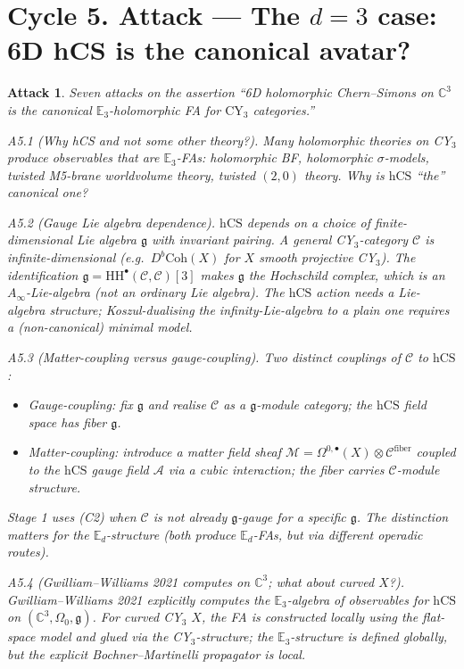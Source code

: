 \documentclass[11pt]{article}
\newtheorem*{attack}{Attack}
\theoremstyle{definition}
\providecommand{\CC}{\mathbb{C}}
\providecommand{\HH}{\mathrm{HH}}
\providecommand{\fg}{\mathfrak{g}}
\providecommand{\cA}{\mathcal{A}}
\providecommand{\cC}{\mathcal{C}}
\providecommand{\cM}{\mathcal{M}}
\providecommand{\hCS}{\mathrm{hCS}}
\providecommand{\Coh}{\mathrm{Coh}}
\begin{document}
\section*{Cycle 5. Attack --- The $d=3$ case: 6D hCS is the canonical avatar?}

\begin{attack}
Seven attacks on the assertion ``6D holomorphic Chern--Simons on
$\CC^3$ is the canonical $\mathbb{E}_3$-holomorphic FA for $\mathrm{CY}_3$
categories.''

\emph{A5.1 (Why hCS and not some other theory?).} Many holomorphic
theories on CY$_3$ produce observables that are $\mathbb{E}_3$-FAs:
holomorphic BF, holomorphic $\sigma$-models, twisted M5-brane
worldvolume theory, twisted $(2,0)$ theory. Why is $\hCS$ ``the''
canonical one?

\emph{A5.2 (Gauge Lie algebra dependence).} $\hCS$ depends on a
choice of finite-dimensional Lie algebra $\fg$ with invariant pairing.
A general CY$_3$-category $\cC$ is infinite-dimensional (e.g.\
$D^b\Coh(X)$ for $X$ smooth projective CY$_3$). The identification
$\fg = \HH^{\bullet}(\cC,\cC)[3]$ makes $\fg$ the Hochschild complex,
which is an $A_\infty$-Lie-algebra (not an ordinary Lie algebra). The
$\hCS$ action needs a Lie-algebra structure; Koszul-dualising the
infinity-Lie-algebra to a plain one requires a (non-canonical) minimal
model.

\emph{A5.3 (Matter-coupling versus gauge-coupling).} Two distinct
couplings of $\cC$ to $\hCS$:
\begin{itemize}[leftmargin=2em]
  \item[(C1)] \emph{Gauge-coupling}: fix $\fg$ and realise $\cC$ as a
              $\fg$-module category; the $\hCS$ field space has fiber
              $\fg$.
  \item[(C2)] \emph{Matter-coupling}: introduce a matter field sheaf
              $\cM = \Omega^{0,\bullet}(X)\otimes \cC^{\mathrm{fiber}}$
              coupled to the $\hCS$ gauge field $\cA$ via a cubic
              interaction; the fiber carries $\cC$-module structure.
\end{itemize}
Stage 1 uses (C2) when $\cC$ is not already $\fg$-gauge for a specific
$\fg$. The distinction matters for the $\mathbb{E}_d$-structure (both
produce $\mathbb{E}_d$-FAs, but via different operadic routes).

\emph{A5.4 (Gwilliam--Williams 2021 computes on $\CC^3$; what about
curved $X$?).} Gwilliam--Williams 2021 explicitly computes the
$\mathbb{E}_3$-algebra of observables for $\hCS$ on $(\CC^3, \Omega_0,
\fg)$. For curved CY$_3$ $X$, the FA is constructed locally using
the flat-space model and glued via the CY$_3$-structure; the
$\mathbb{E}_3$-structure is defined globally, but the explicit
Bochner--Martinelli propagator is local.


\end{attack}
\end{document}
